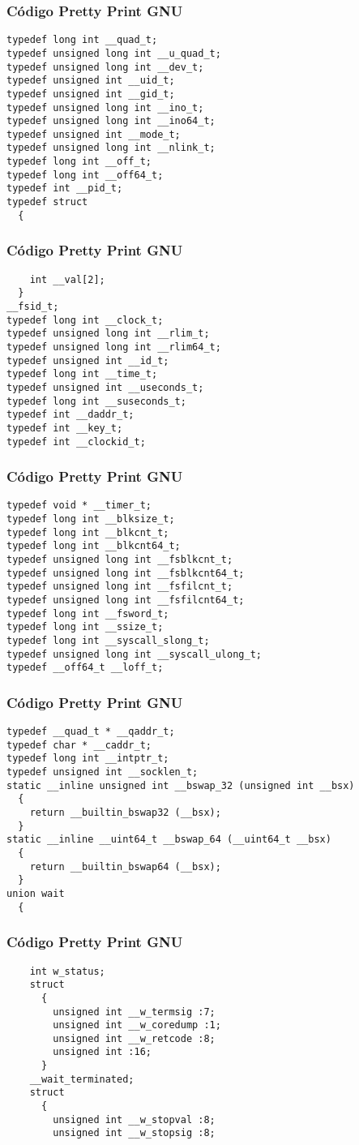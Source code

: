 \documentclass{beamer}
\begin{document}
\begin{frame}[fragile]
\frametitle{C\'odigo Pretty Print GNU}
\begin{verbatim}
typedef long int __quad_t;
typedef unsigned long int __u_quad_t;
typedef unsigned long int __dev_t;
typedef unsigned int __uid_t;
typedef unsigned int __gid_t;
typedef unsigned long int __ino_t;
typedef unsigned long int __ino64_t;
typedef unsigned int __mode_t;
typedef unsigned long int __nlink_t;
typedef long int __off_t;
typedef long int __off64_t;
typedef int __pid_t;
typedef struct
  {
    \end{verbatim}
\end{frame}
\begin{frame}[fragile]
\frametitle{C\'odigo Pretty Print GNU}
\begin{verbatim}
    int __val[2];
  }
__fsid_t;
typedef long int __clock_t;
typedef unsigned long int __rlim_t;
typedef unsigned long int __rlim64_t;
typedef unsigned int __id_t;
typedef long int __time_t;
typedef unsigned int __useconds_t;
typedef long int __suseconds_t;
typedef int __daddr_t;
typedef int __key_t;
typedef int __clockid_t;
\end{verbatim}
\end{frame}
\begin{frame}[fragile]
\frametitle{C\'odigo Pretty Print GNU}
\begin{verbatim}
typedef void * __timer_t;
typedef long int __blksize_t;
typedef long int __blkcnt_t;
typedef long int __blkcnt64_t;
typedef unsigned long int __fsblkcnt_t;
typedef unsigned long int __fsblkcnt64_t;
typedef unsigned long int __fsfilcnt_t;
typedef unsigned long int __fsfilcnt64_t;
typedef long int __fsword_t;
typedef long int __ssize_t;
typedef long int __syscall_slong_t;
typedef unsigned long int __syscall_ulong_t;
typedef __off64_t __loff_t;
\end{verbatim}
\end{frame}
\begin{frame}[fragile]
\frametitle{C\'odigo Pretty Print GNU}
\begin{verbatim}
typedef __quad_t * __qaddr_t;
typedef char * __caddr_t;
typedef long int __intptr_t;
typedef unsigned int __socklen_t;
static __inline unsigned int __bswap_32 (unsigned int __bsx)
  {
    return __builtin_bswap32 (__bsx);
  }
static __inline __uint64_t __bswap_64 (__uint64_t __bsx)
  {
    return __builtin_bswap64 (__bsx);
  }
union wait
  {
    \end{verbatim}
\end{frame}
\begin{frame}[fragile]
\frametitle{C\'odigo Pretty Print GNU}
\begin{verbatim}
    int w_status;
    struct
      {
        unsigned int __w_termsig :7;
        unsigned int __w_coredump :1;
        unsigned int __w_retcode :8;
        unsigned int :16;
      }
    __wait_terminated;
    struct
      {
        unsigned int __w_stopval :8;
        unsigned int __w_stopsig :8;
\end{verbatim}
\end{frame}
\end{document}
